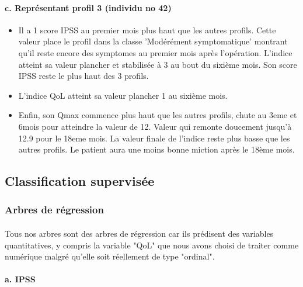 \documentclass[11pt]{article}
\providecommand{\tightlist}{%
      \setlength{\itemsep}{0pt}\setlength{\parskip}{0pt}}
\begin{document}
    \paragraph{c. Représentant profil 3 (individu no
42)}\label{c.-repruxe9sentant-profil-3-individu-no-42}


\begin{itemize}
\tightlist
\item
Il a 1 score IPSS au premier mois plus haut que les autres profils.
Cette valeur place le profil dans la classe 'Modérément symptomatique'
montrant qu'il reste encore des symptomes au premier mois après
l'opération. L'indice atteint sa valeur plancher et stabilisée à 3 au
bout du sixième mois. Son score IPSS reste le plus haut des 3 profils.
\item
L'indice QoL atteint sa valeur plancher 1 au sixième mois.
\item
Enfin, son Qmax commence plus haut que les autres profils, chute au 3eme
et 6mois pour atteindre la valeur de 12. Valeur qui remonte doucement
jusqu'à 12.9 pour le 18eme mois. La valeur finale de l'indice reste plus
basse que les autres profils. Le patient aura une moins bonne miction
après le 18ème mois.
\end{itemize}

    \subsection{Classification
supervisée}\label{classification-supervisuxe9e}

    \subsubsection{Arbres de
régression}\label{arbres-de-ruxe9gression}

\paragraph{}Tous nos arbres sont des arbres de régression car ils prédisent des
variables quantitatives, y compris la variable "QoL" que nous avons
choisi de traiter comme numérique malgré qu'elle soit réellement de type
"ordinal".

    \paragraph{a. IPSS}\label{a.-ipss}



    \begin{center}
    \end{center}
    
\end{document}
